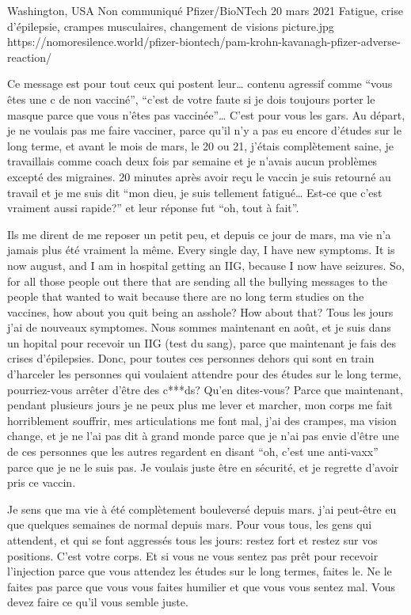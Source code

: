 {Washington, USA}
{Non communiqué}
{Pfizer/BioNTech}
{20 mars 2021}
{Fatigue, crise d'épilepsie, crampes musculaires, changement de visions}
{picture.jpg}
{https://nomoresilence.world/pfizer-biontech/pam-krohn-kavanagh-pfizer-adverse-reaction/}
{

Ce message est pour tout ceux qui postent leur… contenu agressif comme “vous
êtes une c de non vacciné”, “c'est de votre faute si je dois toujours porter le
masque parce que vous n'êtes pas vaccinée”… C'est pour vous les gars. Au départ,
je ne voulais pas me faire vacciner, parce qu'il n'y a pas eu encore d'études
sur le long terme, et avant le mois de mars, le 20 ou 21, j'étais complètement
saine, je travaillais comme coach deux fois par semaine et je n'avais aucun
problèmes excepté des migraines. 20 minutes après avoir reçu le vaccin je suis
retourné au travail et je me suis dit “mon dieu, je suis tellement fatigué…
Est-ce que c'est vraiment aussi rapide?” et leur réponse fut “oh, tout à fait”.

Ils me dirent de me reposer un petit peu, et depuis ce jour de mars, ma vie n'a
jamais plus été vraiment la même. Every single day, I have new symptoms. It is
now august, and I am in hospital getting an IIG, because I now have
seizures. So, for all those people out there that are sending all the bullying
messages to the people that wanted to wait because there are no long term
studies on the vaccines, how about you quit being an asshole? How about that?
Tous les jours j'ai de nouveaux symptomes. Nous sommes maintenant en août, et je
suis dans un hopital pour recevoir un IIG (test du sang), parce que maintenant
je fais des crises d'épilepsies. Donc, pour toutes ces personnes dehors qui sont
en train d'harceler les personnes qui voulaient attendre pour des études sur le
long terme, pourriez-vous arrêter d'être des c***ds? Qu'en dites-vous? Parce que
maintenant, pendant plusieurs jours je ne peux plus me lever et marcher, mon
corps me fait horriblement souffrir, mes articulations me font mal, j'ai des
crampes, ma vision change, et je ne l'ai pas dit à grand monde parce que je n'ai
pas envie d'être une de ces personnes que les autres regardent en disant “oh,
c'est une anti-vaxx” parce que je ne le suis pas. Je voulais juste être en
sécurité, et je regrette d'avoir pris ce vaccin.

Je sens que ma vie à été complètement bouleversé depuis mars. j'ai peut-être eu
que quelques semaines de normal depuis mars. Pour vous tous, les gens qui
attendent, et qui se font aggressés tous les jours: restez fort et restez sur
vos positions. C'est votre corps. Et si vous ne vous sentez pas prêt pour
recevoir l'injection parce que vous attendez les études sur le long termes,
faites le. Ne le faites pas parce que vous vous faites humilier et que vous vous
sentez mal. Vous devez faire ce qu'il vous semble juste.

}
